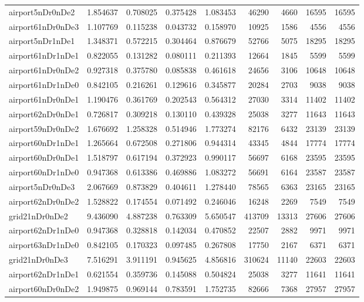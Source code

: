 \begin{longtable}{|l|r|r|r|r|r|r|r|r|}
airport5nDr0nDe2 & 1.854637 & 0.708025 & 0.375428 & 1.083453 & 46290 & 4660 & 16595 & 16595 \\
airport61nDr0nDe3 & 1.107769 & 0.115238 & 0.043732 & 0.158970 & 10925 & 1586 & 4556 & 4556 \\
airport5nDr1nDe1 & 1.348371 & 0.572215 & 0.304464 & 0.876679 & 52766 & 5075 & 18295 & 18295 \\
airport61nDr1nDe1 & 0.822055 & 0.131282 & 0.080111 & 0.211393 & 12664 & 1845 & 5599 & 5599 \\
airport61nDr0nDe2 & 0.927318 & 0.375780 & 0.085838 & 0.461618 & 24656 & 3106 & 10648 & 10648 \\
airport61nDr1nDe0 & 0.842105 & 0.216261 & 0.129616 & 0.345877 & 20284 & 2703 & 9038 & 9038 \\
airport61nDr0nDe1 & 1.190476 & 0.361769 & 0.202543 & 0.564312 & 27030 & 3314 & 11402 & 11402 \\
airport62nDr0nDe1 & 0.726817 & 0.309218 & 0.130110 & 0.439328 & 25038 & 3277 & 11643 & 11643 \\
airport59nDr0nDe2 & 1.676692 & 1.258328 & 0.514946 & 1.773274 & 82176 & 6432 & 23139 & 23139 \\
airport60nDr1nDe1 & 1.265664 & 0.672508 & 0.271806 & 0.944314 & 43345 & 4844 & 17774 & 17774 \\
airport60nDr0nDe1 & 1.518797 & 0.617194 & 0.372923 & 0.990117 & 56697 & 6168 & 23595 & 23595 \\
airport60nDr1nDe0 & 0.947368 & 0.613386 & 0.469886 & 1.083272 & 56691 & 6164 & 23587 & 23587 \\
airport5nDr0nDe3 & 2.067669 & 0.873829 & 0.404611 & 1.278440 & 78565 & 6363 & 23165 & 23165 \\
airport62nDr0nDe2 & 1.528822 & 0.174554 & 0.071492 & 0.246046 & 16248 & 2269 & 7549 & 7549 \\
grid21nDr0nDe2 & 9.436090 & 4.887238 & 0.763309 & 5.650547 & 413709 & 13313 & 27606 & 27606 \\
airport62nDr1nDe0 & 0.947368 & 0.328818 & 0.142034 & 0.470852 & 22507 & 2882 & 9971 & 9971 \\
airport63nDr1nDe0 & 0.842105 & 0.170323 & 0.097485 & 0.267808 & 17750 & 2167 & 6371 & 6371 \\
grid21nDr0nDe3 & 7.516291 & 3.911191 & 0.945625 & 4.856816 & 310624 & 11140 & 22603 & 22603 \\
airport62nDr1nDe1 & 0.621554 & 0.359736 & 0.145088 & 0.504824 & 25038 & 3277 & 11641 & 11641 \\
airport60nDr0nDe2 & 1.949875 & 0.969144 & 0.783591 & 1.752735 & 82666 & 7368 & 27957 & 27957 \\

\end{longtable}
